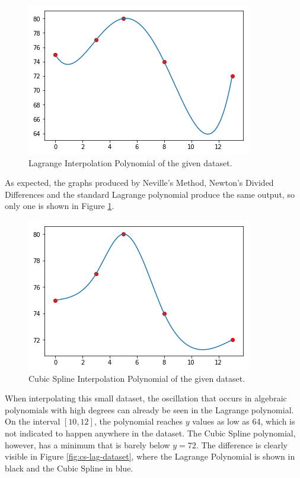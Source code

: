 \documentclass[a4paper,11pt, notitlepage]{article}
\begin{document}
\begin{onehalfspace}
\begin{figure}[H]
	\centering
	\includegraphics[]{./images/lag-dataset.png}
	\caption{Lagrange Interpolation Polynomial of the given dataset.}
	\label{fig:lag-dataset}
\end{figure}
As expected, the graphs produced by Neville's Method, Newton's Divided Differences and the standard Lagrange polynomial produce the same output, so only one is shown in Figure \ref{fig:lag-dataset}.

\begin{figure}[H]
	\centering
	\includegraphics[]{./images/cs-dataset.png}
	\caption{Cubic Spline Interpolation Polynomial of the given dataset.}
	\label{fig:cs-dataset}
\end{figure}

When interpolating this small dataset, the oscillation that occurs in algebraic polynomials with high degrees can already be seen in the Lagrange polynomial. On the interval $[10, 12]$, the polynomial reaches $y$ values as low as 64, which is not indicated to happen anywhere in the dataset. The Cubic Spline polynomial, however, has a minimum that is barely below $y=72$. The difference is clearly visible in Figure \ref{fig:cs-lag-dataset}, where the Lagrange Polynomial is shown in black and the Cubic Spline in blue.


\end{onehalfspace}
\end{document}
